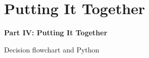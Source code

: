 \documentclass[aspectratio=169]{beamer}
\begin{document}
\section{Putting It Together}

\begin{frame}
\begin{center}
  \vspace{1.5cm}
  {\Huge\bfseries\textcolor{popblue}{Part IV: Putting It Together}}

  \vspace{0.8cm}
  {\large Decision flowchart and Python}
\end{center}
\end{frame}
\end{document}
